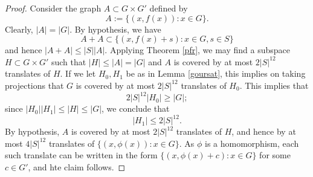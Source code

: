 \begin{proof} Consider the graph $A \subset G \times G'$ defined by
$$ A := \{ (x,f(x)): x \in G \}.$$
Clearly, $|A| = |G|$.  By hypothesis, we have
$$ A+A \subset \{ (x,f(x)+s): x \in G, s \in S\}$$
and hence $|A+A| \leq |S| |A|$.  Applying Theorem \ref{pfr}, we may find a subspace $H \subset G \times G'$ such that $|H| \leq |A|=|G|$ and $A$ is covered by at most $2|S|^{12}$ translates of $H$.  If we let $H_0,H_1$ be as in Lemma \ref{goursat}, this implies on taking projections that $G$ is covered by at most $2|S|^{12}$ translates of $H_0$.  This implies that
$$ 2|S|^{12} |H_0| \geq |G|;$$
since $|H_0| |H_1| \leq |H| \leq |G|$, we conclude that
$$ |H_1| \leq 2|S|^{12}.$$
By hypothesis, $A$ is covered by at most $2|S|^{12}$ translates of $H$, and hence by at most $4|S|^{12}$ translates of $\{ (x,\phi(x)): x \in G \}$.  As $\phi$ is a homomorphism, each such translate can be written in the form $\{ (x,\phi(x)+c): x \in G \}$ for some $c \in G'$, and hte claim follows.
\end{proof}
